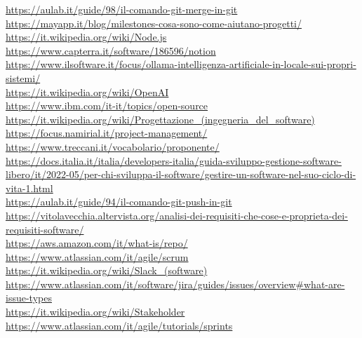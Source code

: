 \begin{small}
\begin{multicols*}{2}
\url{https://aulab.it/guide/98/il-comando-git-merge-in-git}\\
\url{https://mayapp.it/blog/milestones-cosa-sono-come-aiutano-progetti/}\\
\url{https://it.wikipedia.org/wiki/Node.js}\\
\url{https://www.capterra.it/software/186596/notion}\\
\url{https://www.ilsoftware.it/focus/ollama-intelligenza-artificiale-in-locale-sui-propri-sistemi/}\\
\url{https://it.wikipedia.org/wiki/OpenAI}\\
\url{https://www.ibm.com/it-it/topics/open-source}\\
\url{https://it.wikipedia.org/wiki/Progettazione_(ingegneria_del_software)}\\
\url{https://focus.namirial.it/project-management/}\\
\url{https://www.treccani.it/vocabolario/proponente/}\\
\url{https://docs.italia.it/italia/developers-italia/guida-sviluppo-gestione-software-libero/it/2022-05/per-chi-sviluppa-il-software/gestire-un-software-nel-suo-ciclo-di-vita-1.html}\\
\url{https://aulab.it/guide/94/il-comando-git-push-in-git}\\
\url{https://vitolavecchia.altervista.org/analisi-dei-requisiti-che-cose-e-proprieta-dei-requisiti-software/}\\
\url{https://aws.amazon.com/it/what-is/repo/}\\
\url{https://www.atlassian.com/it/agile/scrum}\\
\url{https://it.wikipedia.org/wiki/Slack_(software)}\\
\url{https://www.atlassian.com/it/software/jira/guides/issues/overview#what-are-issue-types}\\
\url{https://it.wikipedia.org/wiki/Stakeholder}\\
\url{https://www.atlassian.com/it/agile/tutorials/sprints}\\
\url{}\\
\url{}\\
\url{}\\

\end{multicols*}
\end{small}

